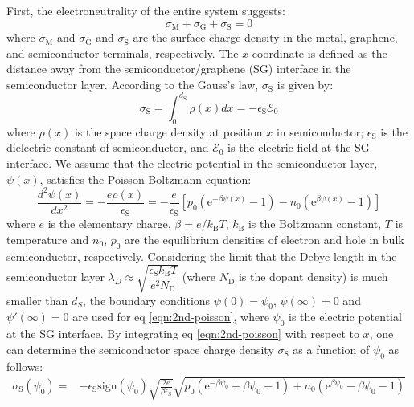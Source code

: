 \documentclass[journal=nalefd]{achemso}
\newcommand*\subs[1]{_{\text{#1}}} %
\begin{document}
First, the electroneutrality of the entire system suggests:
\begin{equation}
    \sigma\subs{M}+\sigma\subs{G}+\sigma\subs{S}=0
    \label{eqn:charge-balance}
\end{equation}
where $\sigma\subs{M}$ and $\sigma\subs{G}$ and $\sigma\subs{S}$ are the surface charge density in the metal, graphene, and semiconductor terminals, respectively.
The $x$ coordinate is defined as the distance away from the semiconductor/graphene (SG) interface in the semiconductor layer. According to the Gauss's law, $\sigma\subs{S}$ is given by:
\begin{equation}
    \sigma\subs{S} = \int_{0}^{d\subs{S}} \rho(x) dx = -\epsilon\subs{S} \mathscr{E}_0
    \label{eqn:sigma_S}
\end{equation}
where $\rho(x)$ is the space charge density at position $x$ in semiconductor; $\epsilon\subs{S}$ is the dielectric constant of semiconductor, and $\mathscr{E}_0$ is the electric field at the SG interface.
We assume that the electric potential in the semiconductor layer, $\psi(x)$, satisfies the Poisson-Boltzmann equation:
\begin{equation}
    \label{eqn:2nd-poisson}
    \frac{d^2 \psi(x)}{dx^2} = -\frac{e\rho(x)}{\epsilon\subs{S}} = - \frac{e}{\epsilon\subs{S}}[p_0(\text{e}^{-\beta \psi(x)}-1) - n_0(\text{e}^{\beta \psi(x)} -1)]
\end{equation}
where $e$ is the elementary charge, $\beta=e/k\subs{B} T$, $k\subs{B}$ is the Boltzmann constant, $T$ is temperature and $n_0$, $p_0$ are the equilibrium densities of electron and hole in bulk semiconductor, respectively.
Considering the limit that the Debye length in the semiconductor layer $\lambda_D\approx\sqrt{\dfrac{\epsilon\subs{S} k\subs{B} T}{e^2 N\subs{D}}}$ (where $N\subs{D}$ is the dopant density) is much smaller than $d_S$, the boundary conditions $\psi(0)=\psi_0$, $\psi(\infty)=0$ and $\psi'(\infty)=0$ are used for eq \ref{eqn:2nd-poisson}, where $\psi_0$ is the electric potential at the SG interface.
By integrating eq \ref{eqn:2nd-poisson} with respect to $x$, one can determine the semiconductor space charge density $\sigma\subs{S}$ as a function of $\psi_0$ as follows:
\begin{equation}
    \label{eqn:sigma_S_exact}
    \begin{aligned}
    \sigma\subs{S}(\psi_0) = &-\epsilon\subs{S} \mathrm{sign}(\psi_0)\sqrt{\frac{2e}{\beta \epsilon\subs{S}}} \sqrt{p_0(\text{e}^{-\beta\psi_0} + \beta \psi_0 -1) + n_0(\text{e}^{\beta\psi_0} - \beta \psi_0 -1) }
    \end{aligned}
\end{equation}
\end{document}
